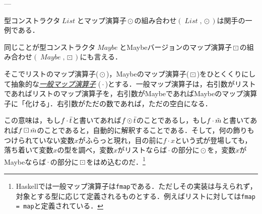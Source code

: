 \documentclass[a5paper,draft]{jsbook}
\newcommand{\programminglanguage}[1]{\textsf{#1}}
\newcommand{\haskell}{\programminglanguage{Haskell}}
\newcommand{\keyword}[1]{{\underline{\emph{#1}}}}
\newcommand{\code}[1]{\texttt{#1}}
\newcommand{\mathSet}[1]{\mathbf{#1}} %
\newcommand{\mathTypeName}[1]{\mathbf{#1}}
\newcommand{\mathTypeConstructor}[1]{\mathit{#1}} %
\newcommand{\mathListType}[1]{\left[#1\right]}
\newcommand{\mathListVar}[1]{\Bar{#1}}
\newcommand{\mathMaybeVar}[1]{\Tilde{#1}}
\DeclareMathOperator{\mathList}{\mathTypeConstructor{List}}
\DeclareMathOperator{\mathMaybe}{\mathTypeConstructor{Maybe}}
\newcommand{\mathBinaryOperator}[1]{\operatorname{#1}}
\newcommand{\mathGeneralMap}{\mathBinaryOperator{\cdot}}
\newcommand{\mathMap}{\mathBinaryOperator{\odot}}
\newcommand{\mathMaybeMap}{\mathBinaryOperator{\boxdot}}
\newcommand{\mathCategoryShort}[2]{(#1,#2)}
\begin{document}


---

型コンストラクタ$\mathList$とマップ演算子$\mathMap$の組み合わせ$(\mathList,\mathMap)$は関手の一例である．

同じことが型コンストラクタ$\mathMaybe$とMaybeバージョンのマップ演算子$\mathMaybeMap$の組み合わせ$(\mathMaybe,\mathMaybeMap)$にも言える．

そこでリストのマップ演算子($\mathMap$)，Maybeのマップ演算子($\mathMaybeMap$)をひとくくりにして抽象的な\keyword{一般マップ演算子} ($\mathGeneralMap$)とする．一般マップ演算子は，右引数がリストであればリストのマップ演算子を，右引数がMaybeであればMaybeのマップ演算子に「化ける」．右引数がただの数であれば，ただの空白になる．

この意味は，もし$f\mathGeneralMap\mathListVar{t}$と書いてあれば$f\mathMap\mathListVar{t}$のことであるし，もし$f\mathGeneralMap\mathMaybeVar{m}$と書いてあれば$f\mathMaybeMap\mathMaybeVar{m}$のことであると，自動的に解釈することである．そして，何の飾りもつけられていない変数$x$がふらっと現れ，目の前に$f\mathGeneralMap x$という式が登場しても，落ち着いて変数$x$の型を調べ，変数$x$がリストならば$\mathGeneralMap$の部分に$\mathMap$を，変数$x$がMaybeならば$\mathGeneralMap$の部分に$\mathMaybeMap$をはめ込むのだ．\footnote{\haskell では一般マップ演算子は\code{fmap}である．ただしその実装は与えられず，対象とする型に応じて定義されるものとする．例えばリストに対しては\code{fmap = map}と定義されている．}
\end{document}
